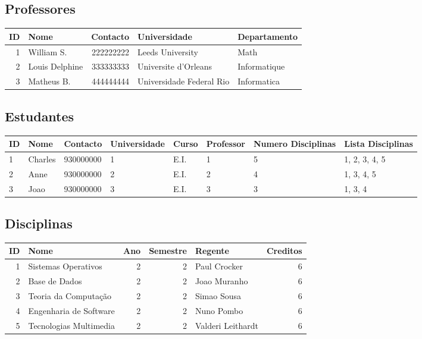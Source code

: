 \documentclass{article}
\begin{document}
\subsection{Professores}
\label{sec:org960cfbe}

\begin{center}
\begin{tabular}{rlrll}
\hline
ID & Nome & Contacto & Universidade & Departamento\\
\hline
1 & William S. & 222222222 & Leeds University & Math\\
2 & Louis Delphine & 333333333 & Universite d'Orleans & Informatique\\
3 & Matheus B. & 444444444 & Universidade Federal Rio & Informatica\\
\hline
\end{tabular}
\end{center}

\pagebreak{}
\subsection{Estudantes}
\label{sec:org1d4e9d4}

\begin{center}
\begin{tabular}{llllllp{1.5cm}p{1.7cm}}
\hline
ID & Nome & Contacto & Universidade & Curso & Professor & Numero \newline Disciplinas & Lista \newline Disciplinas\\
\hline
1 & Charles & 930000000 & 1 & E.I. & 1 & 5 & 1, 2, 3, 4, 5\\
2 & Anne & 930000000 & 2 & E.I. & 2 & 4 & 1, 3, 4, 5\\
3 & Joao & 930000000 & 3 & E.I. & 3 & 3 & 1, 3, 4\\
\hline
\end{tabular}
\end{center}

\subsection{Disciplinas}
\label{sec:org7da50e0}

\begin{center}
\begin{tabular}{rlrrlr}
\hline
ID & Nome & Ano & Semestre & Regente & Creditos\\
\hline
1 & Sistemas Operativos & 2 & 2 & Paul Crocker & 6\\
2 & Base de Dados & 2 & 2 & Joao Muranho & 6\\
3 & Teoria da Computação & 2 & 2 & Simao Sousa & 6\\
4 & Engenharia de Software & 2 & 2 & Nuno Pombo & 6\\
5 & Tecnologias Multimedia & 2 & 2 & Valderi Leithardt & 6\\
\hline
\end{tabular}
\end{center}
\end{document}
